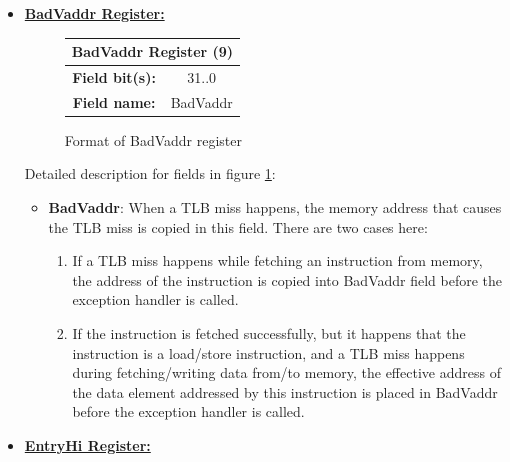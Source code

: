 \documentclass[]{scrartcl}
\begin{document}
\begin{itemize}
\begin{itemize}
\end{itemize}

\item \textbf{\underline{BadVaddr Register:}}\\

\begin{figure}[H]
\begin{center}
\begin{tabular}{|c|c|}

\hline \multicolumn{2}{|c|}{BadVaddr Register (9)} \\

\hline \textbf{Field bit(s):} & 31..0    \\

\hline \textbf{Field name:}   & BadVaddr \\

\hline

\end{tabular}

\end{center}
\caption{Format of BadVaddr register}
\label{badvaddr_reg}
\end{figure}

Detailed description for fields in figure \ref{badvaddr_reg}:

\begin{itemize}

\item \textbf{BadVaddr}: When a TLB miss happens, the memory
      address that causes the TLB miss is copied in this
      field. There are two cases here:
      \begin{enumerate}
      \item If a TLB miss happens while fetching an instruction
            from memory, the address of the instruction is
            copied into BadVaddr field before the exception
            handler is called.
      \item If the instruction is fetched successfully, but it
            happens that the instruction is a load/store instruction,
            and a TLB miss happens during fetching/writing data
            from/to memory, the effective address of the data element
            addressed by this instruction is placed in BadVaddr before
            the exception handler is called.
      \end{enumerate}

\end{itemize}

\item \textbf{\underline{EntryHi Register:}}\\


\end{itemize}
\end{document}
